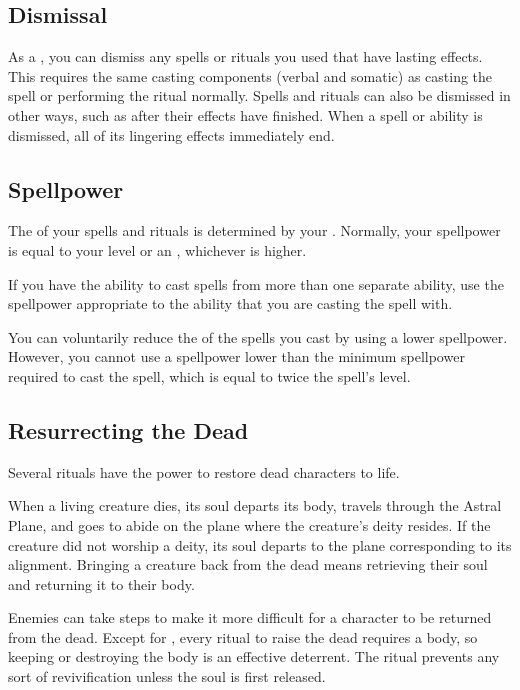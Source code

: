     \subsection{Dismissal}
        As a , you can dismiss any spells or rituals you used that have lasting effects.
        This requires the same casting components (verbal and somatic) as casting the spell or performing the ritual normally.
        Spells and rituals can also be dismissed in other ways, such as after their effects have finished.
        When a spell or ability is dismissed, all of its lingering effects immediately end.

    \subsection{Spellpower}

        The  of your spells and rituals is determined by your .
        Normally, your spellpower is equal to your level or an , whichever is higher.

         If you have the ability to cast spells from more than one separate ability, use the spellpower appropriate to the ability that you are casting the spell with.

         You can voluntarily reduce the  of the spells you cast by using a lower spellpower.
        However, you cannot use a spellpower lower than the minimum spellpower required to cast the spell, which is equal to twice the spell's level.

    \subsection{Resurrecting the Dead}\label{Resurrecting the Dead}
        Several rituals have the power to restore dead characters to life.

        When a living creature dies, its soul departs its body, travels through the Astral Plane, and goes to abide on the plane where the creature's deity resides.
        If the creature did not worship a deity, its soul departs to the plane corresponding to its alignment.
        Bringing a creature back from the dead means retrieving their soul and returning it to their body.

         Enemies can take steps to make it more difficult for a character to be returned from the dead.
        Except for , every ritual to raise the dead requires a body, so keeping or destroying the body is an effective deterrent.
        The  ritual prevents any sort of revivification unless the soul is first released.

